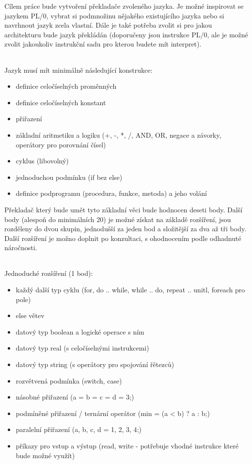 \documentclass[12pt, a4paper]{article}
\begin{document}
Cílem práce bude vytvoření překladače zvoleného jazyka. Je možné inspirovat se jazykem PL/0, vybrat si podmnožinu nějakého existujícího jazyka nebo si navrhnout jazyk zcela vlastní. Dále je také potřeba zvolit si pro jakou architekturu bude jazyk překládán (doporučeny jsou instrukce PL/0, ale je možné zvolit jakoukoliv instrukční sadu pro kterou budete mít interpret).

\mbox{}\\
\noindent Jazyk musí mít minimálně následující konstrukce:
\begin{itemize}
\item definice celočíselných proměnných
\item definice celočíselných konstant
\item přiřazení
\item základní aritmetiku a logiku (+, -, *, /, AND, OR, negace a závorky, operátory pro porovnání čísel)
\item cyklus (libovolný)
\item jednoduchou podmínku (if bez else)
\item definice podprogramu (procedura, funkce, metoda) a jeho volání
\end{itemize}

\noindent Překladač který bude umět tyto základní věci bude hodnocen deseti body. Další body (alespoň do minimálních 20) je možné získat na základě rozšíření, jsou rozděleny do dvou skupin, jednodušší za jeden bod a složitější za dva až tři body. Další rozšíření je možno doplnit po konzultaci, s ohodnocením podle odhadnuté náročnosti.

\mbox{}\\
\noindent Jednoduché rozšíření (1 bod):
\begin{itemize}
\item každý další typ cyklu (for, do .. while, while .. do, repeat .. unitl, foreach pro pole)
\item else větev
\item datový typ boolean a logické operace s ním
\item datový typ real (s celočíselnými instrukcemi)
\item datový typ string (s operátory pro spojování řětezců)
\item rozvětvená podmínka (switch, case)
\item násobné přiřazení (a = b = c = d = 3;)
\item podmíněné přiřazení / ternární operátor (min = (a < b) ? a : b;)
\item paralelní přiřazení ({a, b, c, d} = {1, 2, 3, 4};)
\item příkazy pro vstup a výstup (read, write - potřebuje vhodné instrukce které bude možné využít)
\end{itemize}
\end{document}
